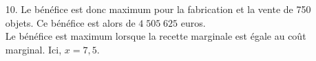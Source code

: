 \vspace*{.3cm}

\begin{itemize}
\item[10.] Le bénéfice est donc maximum pour la fabrication et la vente de 750 objets. Ce bénéfice est alors  de $4 \; 505 \; 625$ euros. \\ Le bénéfice est maximum lorsque la recette marginale est égale au coût marginal. Ici, $x = 7,5$.
\end{itemize}

\ifdefined\COMPLETE
\else
    
\fi